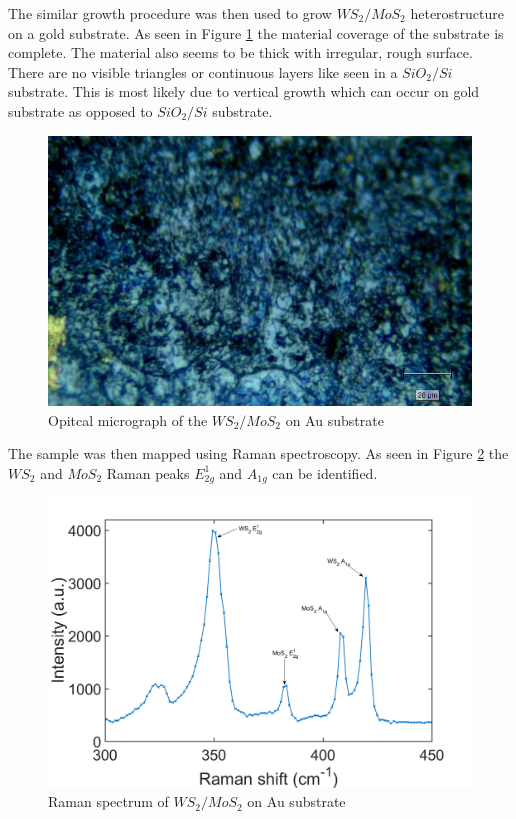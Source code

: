 The similar growth procedure was then used to grow $WS_2/MoS_2$ heterostructure on a gold substrate. As seen in Figure \ref{fig:HeterostructuresOMAu} the material coverage of the substrate is complete. The material also seems to be thick with irregular, rough surface. There are no visible triangles or continuous layers like seen in a $SiO_2/Si$ substrate. This is most likely due to vertical growth which can occur on gold substrate as opposed to $SiO_2/Si$ substrate.

\begin{figure}[H]
	\begin{center}
		\includegraphics[scale=0.3]{Heterostructures/OMAu.png}
		\caption{Opitcal micrograph of the $WS_2/MoS_2$ on Au substrate}
		\label{fig:HeterostructuresOMAu}
	\end{center}
\end{figure}

The sample was then mapped using Raman spectroscopy. As seen in Figure \ref{fig:HeterostructuresRamanSpectrumAu} the $WS_2$ and $MoS_2$ Raman peaks $E^1_{2g}$ and $A_{1g}$ can be identified.

\begin{figure}[H]
	\begin{center}
		\includegraphics[scale=0.3]{Heterostructures/RamanSpectrumAu.png}
		\caption{Raman spectrum of $WS_2/MoS_2$ on Au substrate}
		\label{fig:HeterostructuresRamanSpectrumAu}
	\end{center}
\end{figure}

